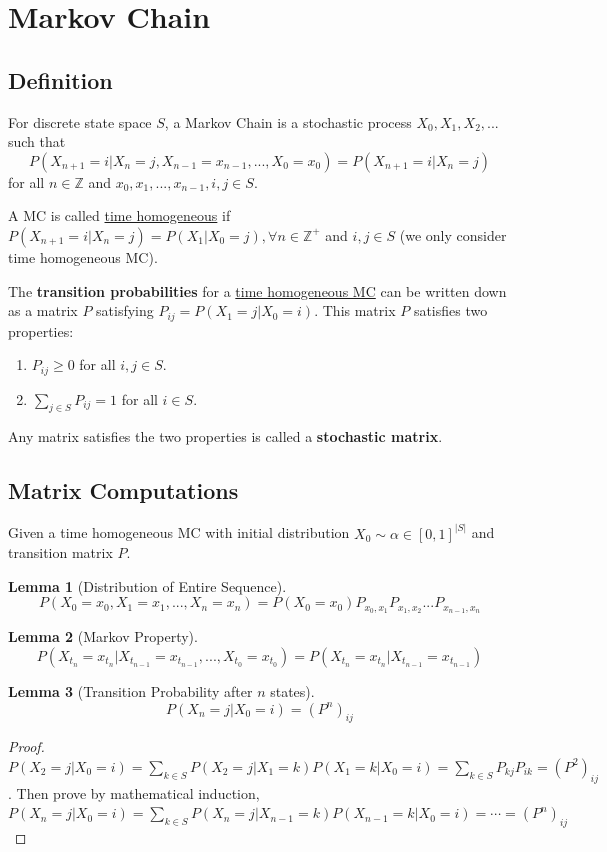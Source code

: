 \documentclass[11pt,a4paper]{article}
\newtheorem{lemma}{Lemma}
\begin{document}
\section{Markov Chain}
\subsection{Definition}
For discrete state space $S$, a Markov Chain is a stochastic process $X_0,X_1,X_2,...$   such that$$P(X_{n+1}=i|X_n=j,X_{n-1}=x_{n-1},...,X_0=x_0)=P(X_{n+1}=i|X_n=j)$$
for all $n\in \mathbb{Z}$ and $x_0,x_1,...,x_{n-1},i,j\in S$.

A MC is called \underline{time homogeneous} if $P(X_{n+1}=i|X_n=j)=P(X_1|X_0=j),\forall n\in \mathbb{Z}^+$ and $i,j\in S$ (we only consider time homogeneous MC).

The \textbf{transition probabilities} for a \underline{time homogeneous MC} can be written down as a matrix $P$ satisfying $P_{ij} = P (X_1 = j|X_0 = i)$. This matrix $P$ satisfies two properties:
\begin{enumerate}[(1)]
    \item $P_{ij}\geq 0$ for all $i,j\in S$.
    \item $\sum_{j\in S}P_{ij}=1$ for all $i\in S$.
\end{enumerate}
Any matrix satisfies the two properties is called a \textbf{stochastic matrix}.

\subsection{Matrix Computations}
Given a time homogeneous MC with initial distribution $X_0\sim\alpha\in [0,1]^{|S|}$ and transition matrix $P$.
\begin{lemma}[Distribution of Entire Sequence]
$$P(X_0=x_0,X_1=x_1,...,X_n=x_n)=P(X_0=x_0)P_{x_0,x_1}P_{x_1,x_2}...P_{x_{n-1},x_n}$$
\end{lemma}

\begin{lemma}[Markov Property]
    $$P(X_{t_n}=x_{t_n} | X_{t_{n-1}}=x_{t_{n-1}},...,X_{t_0}=x_{t_0})=P(X_{t_n}=x_{t_n}|X_{t_{n-1}}=x_{t_{n-1}})$$
\end{lemma}

\begin{lemma}[Transition Probability after $n$ states]
$$P(X_n=j|X_0=i)=(P^n)_{ij}$$
\end{lemma}
\begin{proof}
    $P(X_2=j|X_0=i)=\sum_{k\in S}P(X_2=j|X_1=k)P(X_1=k|X_0=i)=\sum_{k\in S}P_{kj}P_{ik}=(P^2)_{ij}$. Then prove by mathematical induction,
    $P(X_n=j|X_0=i)=\sum_{k\in S}P(X_n=j|X_{n-1}=k)P(X_{n-1}=k|X_0=i)=\cdots =(P^n)_{ij}$
\end{proof}
\end{document}
